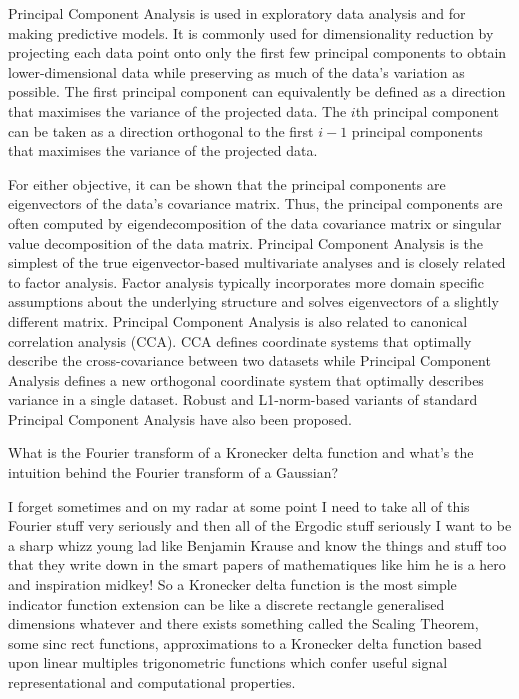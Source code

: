 Principal Component Analysis is used in exploratory data analysis and for making predictive models. It is commonly used for dimensionality reduction by projecting each data point onto only the first few principal components to obtain lower-dimensional data while preserving as much of the data's variation as possible. The first principal component can equivalently be defined as a direction that maximises the variance of the projected data. The $i$th principal component can be taken as a direction orthogonal to the first $i-1$ principal components that maximises the variance of the projected data.

For either objective, it can be shown that the principal components are eigenvectors of the data's covariance matrix. Thus, the principal components are often computed by eigendecomposition of the data covariance matrix or singular value decomposition of the data matrix. Principal Component Analysis is the simplest of the true eigenvector-based multivariate analyses and is closely related to factor analysis. Factor analysis typically incorporates more domain specific assumptions about the underlying structure and solves eigenvectors of a slightly different matrix. Principal Component Analysis is also related to canonical correlation analysis (CCA). CCA defines coordinate systems that optimally describe the cross-covariance between two datasets while Principal Component Analysis defines a new orthogonal coordinate system that optimally describes variance in a single dataset. Robust and L1-norm-based variants of standard Principal Component Analysis have also been proposed.

What is the Fourier transform of a Kronecker delta function and what's the intuition behind the Fourier transform of a Gaussian?

I forget sometimes and on my radar at some point I need to take all of this Fourier stuff very seriously and then all of the Ergodic stuff seriously I want to be a sharp whizz young lad like Benjamin Krause and know the things and stuff too that they write down in the smart papers of mathematiques like him he is a hero and inspiration midkey! So a Kronecker delta function is the most simple indicator function extension can be like a discrete rectangle generalised dimensions whatever and there exists something called the Scaling Theorem, some sinc rect functions, approximations to a Kronecker delta function based upon linear multiples trigonometric functions which confer useful signal representational and computational properties.

